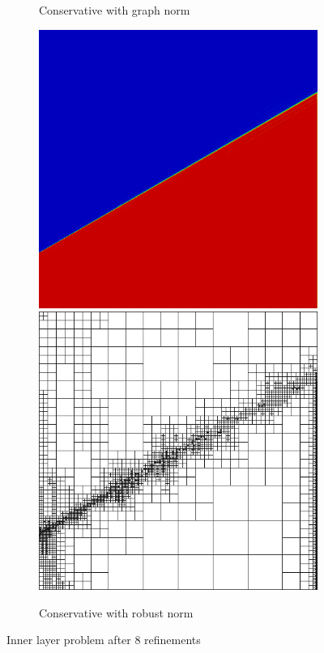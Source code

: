 \documentclass[letterpaper]{article}
\begin{document}
\begin{figure}
\begin{subfigure}[t]{0.45\textwidth}
\caption{Conservative with graph norm}
\label{fig:innerlayerGraph18c}
\end{subfigure}
\begin{subfigure}[t]{0.45\textwidth}
\centering
\includegraphics[width=\textwidth]{figs/InnerLayer/robust8c.png}
\includegraphics[width=\textwidth]{figs/InnerLayer/robust8c_mesh.png}
\caption{Conservative with robust norm}
\label{fig:innerlayerRobust18c}
\end{subfigure}
\caption{Inner layer problem after 8 refinements}
\label{fig:innerlayer8c}
\end{figure}
\end{document}
